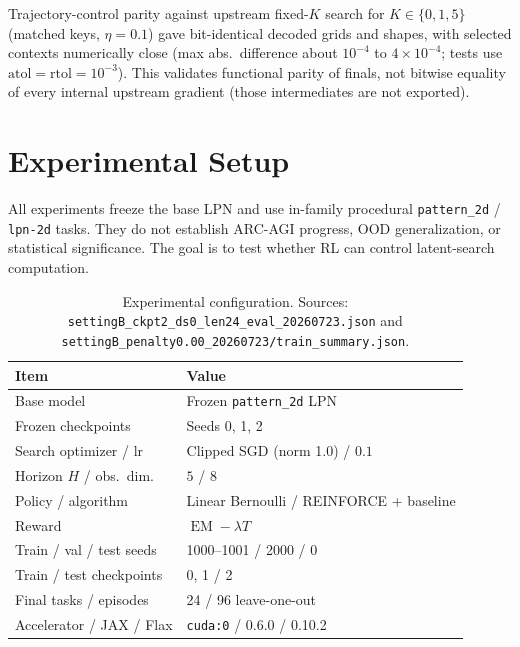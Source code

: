 \documentclass[11pt,a4paper]{article}
\begin{document}
Trajectory-control parity against upstream fixed-$K$ search for
$K\in\{0,1,5\}$ (matched keys, $\eta{=}0.1$) gave bit-identical decoded grids
and shapes, with selected contexts numerically close (max abs.\ difference about
$10^{-4}$ to $4{\times}10^{-4}$; tests use $\mathrm{atol}{=}\mathrm{rtol}{=}10^{-3}$).
This validates functional parity of finals, not bitwise equality of every
internal upstream gradient (those intermediates are not exported).

\section{Experimental Setup}

All experiments freeze the base LPN and use in-family procedural
\texttt{pattern\_2d} / \texttt{lpn-2d} tasks.
They do not establish ARC-AGI progress, OOD generalization, or statistical
significance.
The goal is to test whether RL can control latent-search computation.

\begin{table}[H]
\centering
\caption{Experimental configuration. Sources:
\texttt{settingB\_ckpt2\_ds0\_len24\_eval\_20260723.json} and
\texttt{settingB\_penalty0.00\_20260723/train\_summary.json}.}
\label{tab:setup}
\setlength{\tabcolsep}{3.5pt}
\footnotesize
\begin{tabular}{@{}ll@{}}
\toprule
Item & Value \\
\midrule
Base model & Frozen \texttt{pattern\_2d} LPN \\
Frozen checkpoints & Seeds 0, 1, 2 \\
Search optimizer / lr & Clipped SGD (norm 1.0) / $0.1$ \\
Horizon $H$ / obs.\ dim. & $5$ / $8$ \\
Policy / algorithm & Linear Bernoulli / REINFORCE + baseline \\
Reward & $\operatorname{EM}-\lambda T$ \\
Train / val / test seeds & 1000--1001 / 2000 / 0 \\
Train / test checkpoints & 0, 1 / 2 \\
Final tasks / episodes & 24 / 96 leave-one-out \\
Accelerator / JAX / Flax & \texttt{cuda:0} / 0.6.0 / 0.10.2 \\
\bottomrule
\end{tabular}
\end{table}
\end{document}
